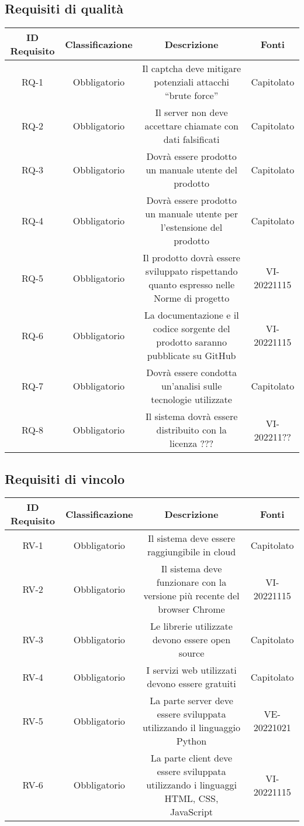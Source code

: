 \subsection{Requisiti di qualità}
\begin{tabular}{| c | c | c | c |} 
 \hline
 \textbf{ID Requisito} & \textbf{Classificazione} & \textbf{Descrizione} & \textbf{Fonti} \\
 \hline
 RQ-1 & Obbligatorio &  Il captcha deve mitigare potenziali attacchi “brute force” & Capitolato\\
 \hline
  RQ-2 & Obbligatorio & Il server non deve accettare chiamate con dati falsificati & Capitolato\\
 \hline
 RQ-3 & Obbligatorio &  Dovrà essere prodotto un manuale utente del prodotto & Capitolato\\
 \hline
 RQ-4 & Obbligatorio &  Dovrà essere prodotto un manuale utente per l’estensione del prodotto &  Capitolato\\
 \hline
 RQ-5 & Obbligatorio & Il prodotto dovrà essere sviluppato rispettando quanto espresso nelle Norme di progetto & VI-20221115\\
 \hline
 RQ-6 & Obbligatorio &  La documentazione e il codice sorgente del prodotto saranno pubblicate su GitHub & VI-20221115\\
 \hline
 RQ-7 & Obbligatorio & Dovrà essere condotta un’analisi sulle tecnologie utilizzate & Capitolato\\
 \hline
 RQ-8 & Obbligatorio &  Il sistema dovrà essere distribuito con la licenza ??? & VI-202211??\\
 \hline
\end{tabular}

\subsection{Requisiti di vincolo}
\begin{tabular}{| c | c | c | c |} 
 \hline
 \textbf{ID Requisito} & \textbf{Classificazione} & \textbf{Descrizione} & \textbf{Fonti} \\
 \hline
 RV-1 & Obbligatorio &  Il sistema deve essere raggiungibile in cloud & Capitolato\\
 \hline
  RV-2 & Obbligatorio & Il sistema deve funzionare con la versione più recente del browser Chrome & VI-20221115\\
 \hline
 RV-3 & Obbligatorio &  Le librerie utilizzate devono essere open source & Capitolato\\
 \hline
 RV-4 & Obbligatorio & I servizi web utilizzati devono essere gratuiti &  Capitolato\\
 \hline
 RV-5 & Obbligatorio & La parte server deve essere sviluppata utilizzando il linguaggio Python & VE-20221021\\
 \hline
 RV-6 & Obbligatorio & La parte client deve essere sviluppata utilizzando i linguaggi HTML, CSS, JavaScript & VI-20221115\\
 \hline
\end{tabular}

